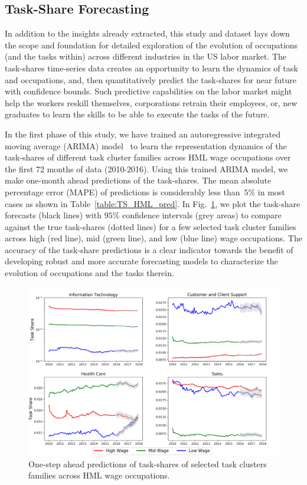 \documentclass[letterpaper]{article} %
\begin{document}
\subsection{Task-Share Forecasting}
\label{subsec:res_forecast}
In addition to the insights already extracted, this study and dataset lays down the scope and foundation for detailed exploration of the evolution of occupations (and the tasks within) across different industries in the US labor market. The task-shares time-series data creates an opportunity to learn the dynamics of task and occupations, and, then quantitatively predict the task-shares for near future with confidence bounds. Such predictive capabilities on the labor market might help the workers reskill themselves, corporations retrain their employees, or, new graduates to learn the skills to be able to execute the tasks of the future.

In the first phase of this study, we have trained an autoregressive integrated moving average (ARIMA) model~\cite{makridakis2008forecasting} to learn the representation dynamics of the task-shares of different task cluster families across HML wage occupations over the first 72 months of data (2010-2016). Using this trained ARIMA model, we make one-month ahead predictions of the task-shares. The mean absolute percentage error (MAPE) of predictions is considerably less than~$5\%$ in most cases as shown in Table~\ref{table:TS_HML_pred}. In Fig.~\ref{fig:pred}, we plot the task-share forecasts (black lines) with $95\%$ confidence intervals (grey areas) to compare against the true task-shares (dotted lines) for a few selected task cluster families across high (red line), mid (green line), and low (blue line) wage occupations. The accuracy of the task-share predictions is a clear indicator towards the benefit of developing robust and more accurate forecasting models to characterize the evolution of occupations and the tasks therein.
\begin{figure}[t!]
  \includegraphics[width=0.96\linewidth]{combined_pred.png}
  \caption{One-step ahead predictions of task-shares of selected task clusters families across HML wage occupations.}
  \label{fig:pred}
\end{figure}
\end{document}
